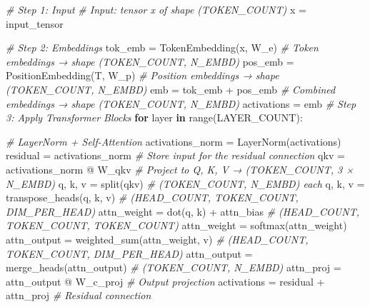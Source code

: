 \documentclass[11pt]{article}
\newenvironment{Shaded}{}{}
\newcommand{\KeywordTok}[1]{\textcolor[rgb]{0.00,0.44,0.13}{\textbf{{#1}}}}
\newcommand{\CommentTok}[1]{\textcolor[rgb]{0.38,0.63,0.69}{\textit{{#1}}}}
\newcommand{\NormalTok}[1]{{#1}}
\newcommand{\ControlFlowTok}[1]{\textcolor[rgb]{0.00,0.44,0.13}{\textbf{{#1}}}}
\newcommand{\OperatorTok}[1]{\textcolor[rgb]{0.40,0.40,0.40}{{#1}}}
\newcommand{\BuiltInTok}[1]{{#1}}
\begin{document}
\begin{Shaded}
\begin{Highlighting}[]
\CommentTok{\# Step 1: Input}
\CommentTok{\# Input: tensor x of shape (TOKEN\_COUNT)}
\NormalTok{x }\OperatorTok{=}\NormalTok{ input\_tensor}

\CommentTok{\# Step 2: Embeddings}
\NormalTok{tok\_emb }\OperatorTok{=}\NormalTok{ TokenEmbedding(x, W\_e)           }\CommentTok{\# Token embeddings → shape (TOKEN\_COUNT, N\_EMBD)}
\NormalTok{pos\_emb }\OperatorTok{=}\NormalTok{ PositionEmbedding(T, W\_p)        }\CommentTok{\# Position embeddings → shape (TOKEN\_COUNT, N\_EMBD)}
\NormalTok{emb }\OperatorTok{=}\NormalTok{ tok\_emb }\OperatorTok{+}\NormalTok{ pos\_emb                    }\CommentTok{\# Combined embeddings → shape (TOKEN\_COUNT, N\_EMBD)}
\NormalTok{activations }\OperatorTok{=}\NormalTok{ emb}
\CommentTok{\# Step 3: Apply Transformer Blocks}
\ControlFlowTok{for}\NormalTok{ layer }\KeywordTok{in} \BuiltInTok{range}\NormalTok{(LAYER\_COUNT):}

    \CommentTok{\# LayerNorm + Self{-}Attention}
\NormalTok{    activations\_norm }\OperatorTok{=}\NormalTok{ LayerNorm(activations)}
\NormalTok{    residual }\OperatorTok{=}\NormalTok{ activations\_norm               }\CommentTok{\# Store input for the residual connection}
\NormalTok{    qkv }\OperatorTok{=}\NormalTok{ activations\_norm }\OperatorTok{@}\NormalTok{ W\_qkv            }\CommentTok{\# Project to Q, K, V → (TOKEN\_COUNT, 3 × N\_EMBD)}
\NormalTok{    q, k, v }\OperatorTok{=}\NormalTok{ split(qkv)                      }\CommentTok{\# (TOKEN\_COUNT, N\_EMBD) each}
\NormalTok{    q, k, v }\OperatorTok{=}\NormalTok{ transpose\_heads(q, k, v)        }\CommentTok{\# (HEAD\_COUNT, TOKEN\_COUNT, DIM\_PER\_HEAD)}
\NormalTok{    attn\_weight }\OperatorTok{=}\NormalTok{ dot(q, k) }\OperatorTok{+}\NormalTok{ attn\_bias       }\CommentTok{\# (HEAD\_COUNT, TOKEN\_COUNT, TOKEN\_COUNT)}
\NormalTok{    attn\_weight }\OperatorTok{=}\NormalTok{ softmax(attn\_weight)}
\NormalTok{    attn\_output }\OperatorTok{=}\NormalTok{ weighted\_sum(attn\_weight, v)     }\CommentTok{\# (HEAD\_COUNT, TOKEN\_COUNT, DIM\_PER\_HEAD)}
\NormalTok{    attn\_output }\OperatorTok{=}\NormalTok{ merge\_heads(attn\_output)         }\CommentTok{\# (TOKEN\_COUNT, N\_EMBD)}
\NormalTok{    attn\_proj }\OperatorTok{=}\NormalTok{ attn\_output }\OperatorTok{@}\NormalTok{ W\_c\_proj             }\CommentTok{\# Output projection}
\NormalTok{    activations }\OperatorTok{=}\NormalTok{ residual }\OperatorTok{+}\NormalTok{ attn\_proj             }\CommentTok{\# Residual connection}


\end{Highlighting}
\end{Shaded}
\end{document}
